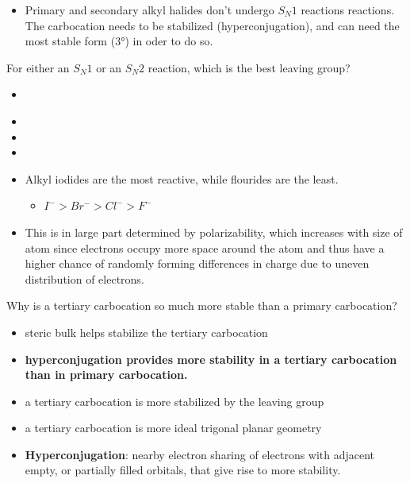 \documentclass[12pt,a4paper]{article}
\begin{document}
\begin{enumerate}
        \begin{itemize}
            \item Primary and secondary alkyl halides don't undergo \(S_N1\) reactions reactions. The carbocation needs to be stabilized (hyperconjugation), and can need the most stable form (\ang{3}) in oder to do so.
        \end{itemize}
    {\color{G-Moon}\item For either an \(S_N1\) or an \(S_N2\) reaction, which is the best leaving group?
    \begin{itemize}
        \item {\color{o-Sun}\textbf{}}
        \item {}
        \item {}
        \item {}
    \end{itemize}}
        \begin{itemize}
            \item Alkyl iodides are the most reactive, while flourides are the least.
            \begin{itemize}
                \item \(I^->Br^->Cl^->F^-\)
            \end{itemize}
            \item This is in large part determined by {\color{o-Sun}polarizability}, which {\color{o-Sun}increases with size of atom} since electrons occupy more space around the atom and thus have a higher chance of randomly forming differences in charge due to uneven distribution of electrons.
        \end{itemize}
    {\color{G-Moon}\item Why is a tertiary carbocation so much more stable than a primary carbocation?
    \begin{itemize}
        \item steric bulk helps stabilize the tertiary carbocation
        \item {\color{o-Sun}\textbf{hyperconjugation provides more stability in a tertiary carbocation than in primary carbocation.}}
        \item a tertiary carbocation is more stabilized by the leaving group
        \item a tertiary carbocation is more ideal trigonal planar geometry
    \end{itemize}}
        \begin{itemize}
            \item \textbf{Hyperconjugation}: nearby electron sharing of electrons with adjacent empty, or partially filled orbitals, that give rise to more stability.

\end{itemize}
\end{enumerate}
\end{document}
